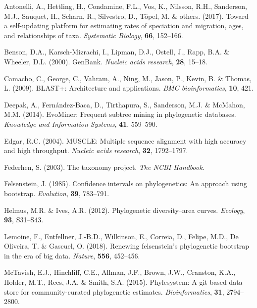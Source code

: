 \documentclass[]{article}
\begin{document}
\leavevmode\hypertarget{ref-antonelli2017toward}{}%
Antonelli, A., Hettling, H., Condamine, F.L., Vos, K., Nilsson, R.H., Sanderson, M.J., Sauquet, H., Scharn, R., Silvestro, D., Töpel, M. \& others. (2017). Toward a self-updating platform for estimating rates of speciation and migration, ages, and relationships of taxa. \emph{Systematic Biology}, \textbf{66}, 152--166.

\leavevmode\hypertarget{ref-benson2000genbank}{}%
Benson, D.A., Karsch-Mizrachi, I., Lipman, D.J., Ostell, J., Rapp, B.A. \& Wheeler, D.L. (2000). GenBank. \emph{Nucleic acids research}, \textbf{28}, 15--18.

\leavevmode\hypertarget{ref-camacho2009blast}{}%
Camacho, C., George, C., Vahram, A., Ning, M., Jason, P., Kevin, B. \& Thomas, L. (2009). BLAST+: Architecture and applications. \emph{BMC bioinformatics}, \textbf{10}, 421.

\leavevmode\hypertarget{ref-deepak2014evominer}{}%
Deepak, A., Fernández-Baca, D., Tirthapura, S., Sanderson, M.J. \& McMahon, M.M. (2014). EvoMiner: Frequent subtree mining in phylogenetic databases. \emph{Knowledge and Information Systems}, \textbf{41}, 559--590.

\leavevmode\hypertarget{ref-edgar2004muscle}{}%
Edgar, R.C. (2004). MUSCLE: Multiple sequence alignment with high accuracy and high throughput. \emph{Nucleic acids research}, \textbf{32}, 1792--1797.

\leavevmode\hypertarget{ref-federhen2003taxonomy}{}%
Federhen, S. (2003). The taxonomy project. \emph{The NCBI Handbook}.

\leavevmode\hypertarget{ref-felsenstein1985confidence}{}%
Felsenstein, J. (1985). Confidence intervals on phylogenetics: An approach using bootstrap. \emph{Evolution}, \textbf{39}, 783--791.

\leavevmode\hypertarget{ref-helmus2012phylogenetic}{}%
Helmus, M.R. \& Ives, A.R. (2012). Phylogenetic diversity--area curves. \emph{Ecology}, \textbf{93}, S31--S43.

\leavevmode\hypertarget{ref-lemoine2018renewing}{}%
Lemoine, F., Entfellner, J.-B.D., Wilkinson, E., Correia, D., Felipe, M.D., De Oliveira, T. \& Gascuel, O. (2018). Renewing felsenstein's phylogenetic bootstrap in the era of big data. \emph{Nature}, \textbf{556}, 452--456.

\leavevmode\hypertarget{ref-mctavish2015phylesystem}{}%
McTavish, E.J., Hinchliff, C.E., Allman, J.F., Brown, J.W., Cranston, K.A., Holder, M.T., Rees, J.A. \& Smith, S.A. (2015). Phylesystem: A git-based data store for community-curated phylogenetic estimates. \emph{Bioinformatics}, \textbf{31}, 2794--2800.
\end{document}
